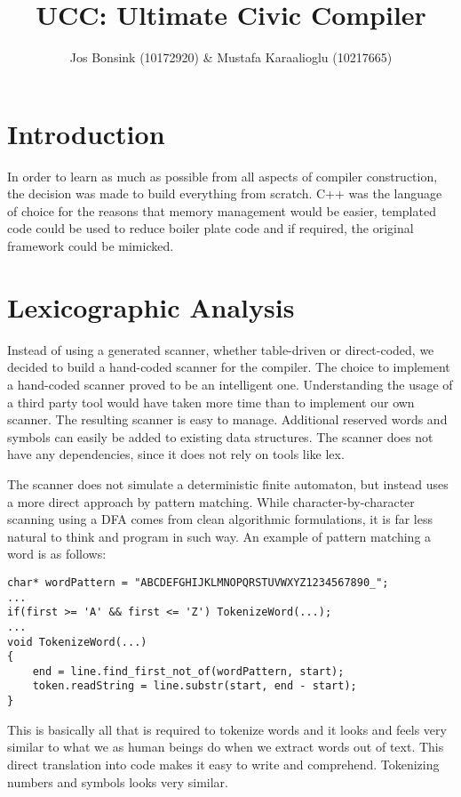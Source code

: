\documentclass[12pt]{article}
\title{UCC: Ultimate Civic Compiler}
\author{Jos Bonsink (10172920) \& Mustafa Karaalioglu (10217665)}
\begin{document}
\maketitle

\tableofcontents
\newpage

\section{Introduction}

In order to learn as much as possible from all aspects of compiler construction, the decision was made to build everything from scratch. C++ was the language of choice for the reasons that memory management would be easier, templated code could be used to reduce boiler plate code and if required, the original framework could be mimicked.

\section{Lexicographic Analysis}

Instead of using a generated scanner, whether table-driven or direct-coded, we decided to build a hand-coded scanner for the compiler. The choice to implement a hand-coded scanner proved to be an intelligent one. Understanding the usage of a third party tool would have taken more time than to implement our own scanner. The resulting scanner is easy to manage. Additional reserved words and symbols can easily be added to existing data structures. The scanner does not have any dependencies, since it does not rely on tools like lex.

The scanner does not simulate a deterministic finite automaton, but instead uses a more direct approach by pattern matching. While character-by-character scanning using a DFA comes from clean algorithmic formulations, it is far less natural to think and program in such way. An example of pattern matching a word is as follows:

\begin{lstlisting}
char* wordPattern = "ABCDEFGHIJKLMNOPQRSTUVWXYZ1234567890_";
...
if(first >= 'A' && first <= 'Z') TokenizeWord(...);
...
void TokenizeWord(...)
{
	end = line.find_first_not_of(wordPattern, start);
	token.readString = line.substr(start, end - start);
}
\end{lstlisting}

This is basically all that is required to tokenize words and it looks and feels very similar to what we as human beings do when we extract words out of text. This direct translation into code makes it easy to write and comprehend. Tokenizing numbers and symbols looks very similar.
\end{document}
